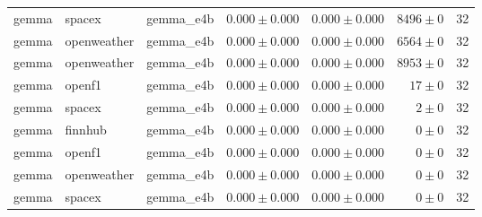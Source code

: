 \begin{table}[htbp]
\begin{tabular}{l l l r r r r}
gemma & spacex & gemma\_e4b & $0.000\pm0.000$ & $0.000\pm0.000$ & $8496\pm0$ & 32 \\
gemma & openweather & gemma\_e4b & $0.000\pm0.000$ & $0.000\pm0.000$ & $6564\pm0$ & 32 \\
gemma & openweather & gemma\_e4b & $0.000\pm0.000$ & $0.000\pm0.000$ & $8953\pm0$ & 32 \\
gemma & openf1 & gemma\_e4b & $0.000\pm0.000$ & $0.000\pm0.000$ & $17\pm0$ & 32 \\
gemma & spacex & gemma\_e4b & $0.000\pm0.000$ & $0.000\pm0.000$ & $2\pm0$ & 32 \\
gemma & finnhub & gemma\_e4b & $0.000\pm0.000$ & $0.000\pm0.000$ & $0\pm0$ & 32 \\
gemma & openf1 & gemma\_e4b & $0.000\pm0.000$ & $0.000\pm0.000$ & $0\pm0$ & 32 \\
gemma & openweather & gemma\_e4b & $0.000\pm0.000$ & $0.000\pm0.000$ & $0\pm0$ & 32 \\
gemma & spacex & gemma\_e4b & $0.000\pm0.000$ & $0.000\pm0.000$ & $0\pm0$ & 32 \\
\hline
\end{tabular}
\end{table}
